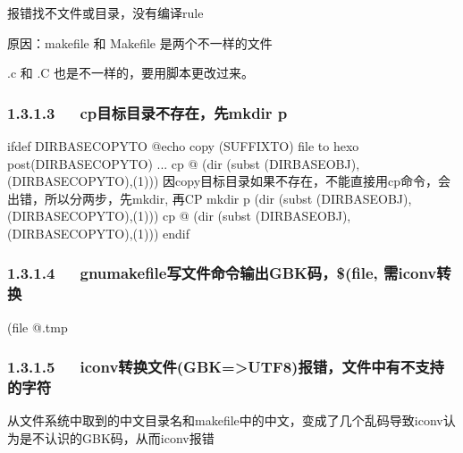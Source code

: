 \documentclass[letterpaper,12pt,english]{sphinxmanual}
\begin{document}
报错找不文件或目录，没有编译rule

原因：makefile 和 Makefile 是两个不一样的文件

.c 和 .C 也是不一样的，要用脚本更改过来。


\subsubsection{1.3.1.3   cp目标目录不存在，先mkdir \sphinxhyphen{}p}
\label{\detokenize{001software/001install/001._u7f51_u7ad9/travisCI:cp-mkdir-p}}
\begin{sphinxVerbatim}[commandchars=\\\{\}]
ifdef DIR\PYGZus{}BASE\PYGZus{}COPYTO
    @echo copy \PYGZdl{}(SUFFIX\PYGZus{}TO) file to \PYGZob{}hexo post\PYGZcb{}\PYGZdl{}(DIR\PYGZus{}BASE\PYGZus{}COPYTO) ...
\PYGZsh{}   cp \PYGZdl{}\PYGZdl{}@ \PYGZdl{}(dir \PYGZdl{}(subst \PYGZdl{}(DIR\PYGZus{}BASE\PYGZus{}OBJ),\PYGZdl{}(DIR\PYGZus{}BASE\PYGZus{}COPYTO),\PYGZdl{}(1)))
\PYGZsh{}因copy目标目录如果不存在，不能直接用cp命令，会出错，所以分两步，先mkdir, 再CP
    mkdir \PYGZhy{}p \PYGZdl{}(dir \PYGZdl{}(subst \PYGZdl{}(DIR\PYGZus{}BASE\PYGZus{}OBJ),\PYGZdl{}(DIR\PYGZus{}BASE\PYGZus{}COPYTO),\PYGZdl{}(1)))
    cp \PYGZdl{}\PYGZdl{}@ \PYGZdl{}(dir \PYGZdl{}(subst \PYGZdl{}(DIR\PYGZus{}BASE\PYGZus{}OBJ),\PYGZdl{}(DIR\PYGZus{}BASE\PYGZus{}COPYTO),\PYGZdl{}(1)))
endif
\end{sphinxVerbatim}


\subsubsection{1.3.1.4   gnumake\sphinxhyphen{}file写文件命令输出GBK码，\$(file, 需iconv转换}
\label{\detokenize{001software/001install/001._u7f51_u7ad9/travisCI:gnumake-filegbk-file-iconv}}
\begin{sphinxVerbatim}[commandchars=\\\{\}]
\PYGZdl{}(file \PYGZgt{}\PYGZdl{}\PYGZdl{}@.tmp
\end{sphinxVerbatim}


\subsubsection{1.3.1.5   iconv转换文件(GBK=>UTF8)报错，文件中有不支持的字符}
\label{\detokenize{001software/001install/001._u7f51_u7ad9/travisCI:iconv-gbk-utf8}}
从文件系统中取到的中文目录名和makefile中的中文，变成了几个乱码导致iconv认为是不认识的GBK码，从而iconv报错
\end{document}
